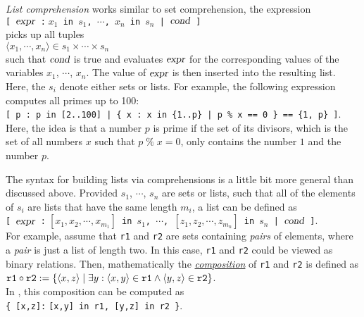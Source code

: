 \emph{List comprehension} works similar to set comprehension, the expression
\\[0.2cm]
\hspace*{1.3cm}
\texttt{[ $\textsl{expr}$ :$\;x_1$ in $s_1$, $\cdots$, $x_n$ in $s_n$ | $\textsl{cond}$ ]}
\\[0.2cm]
 picks up all tuples 
\\[0.2cm]
\hspace*{1.3cm}
$\langle x_1, \cdots, x_n \rangle \in s_1 \times \cdots \times s_n$
\\[0.2cm]
such that $\textsl{cond}$ is true and evaluates $\textsl{expr}$ for the corresponding values of the
variables $x_1$, $\cdots$, $x_n$.  The value of $\textsl{expr}$ is
then inserted into the resulting list.  Here, the $s_i$ denote either sets or lists.
For example, the following expression  computes all primes up
to 100: 
\\[0.2cm]
\hspace*{1.3cm}
\texttt{[ p : p in [2..100] | \{ x : x in \{1..p\} | p \% x == 0 \} == \{1, p\} ]}.
\\[0.2cm]
Here, the idea is that a number $p$ is prime if the set of its divisors, which is the set
of all numbers $x$ such that $p \;\texttt{\%}\; x = 0$, only contains the number $1$ and
the number $p$. 

The syntax for building lists via comprehensions is a little bit more
general than discussed above.  Provided $s_1$, $\cdots$, $s_n$ are sets or lists,
such that all of the elements of $s_i$ are lists that have the same length $m_i$, a list 
can be defined as
\\[0.2cm]
\hspace*{1.3cm}
\texttt{[ $\textsl{expr}$ :$\;[x_1,x_2,\cdots,x_{m_1}]$ in $s_1$, $\cdots$, $[z_1,z_2,\cdots, z_{m_n}]$ in $s_n$ | $\textsl{cond}$ ]}.
\\[0.2cm]
For example, assume that \texttt{r1} and \texttt{r2} are sets containing \emph{pairs} of elements, where a
\emph{pair} is just a list of length two.  In this case, \texttt{r1} and \texttt{r2} could be viewed as binary
relations.  Then, mathematically the 
\href{https://en.wikipedia.org/wiki/Composition_of_relations}{\emph{composition}} of \texttt{r1} and
\texttt{r2} is defined as
\\[0.2cm]
\hspace*{1.3cm}
$\mathtt{r1} \circ \mathtt{r2} := \{ \pair(x,z) \mid \exists y: \pair(x,y) \in \mathtt{r1} \wedge \pair(y,z) \in\mathtt{r2} \}$. 
\\[0.2cm]
In \setlx, this composition can be computed as 
\\[0.2cm]
\hspace*{1.3cm}
\texttt{\{ [x,z]:$\;$[x,y] in r1, [y,z] in r2 \}}.

